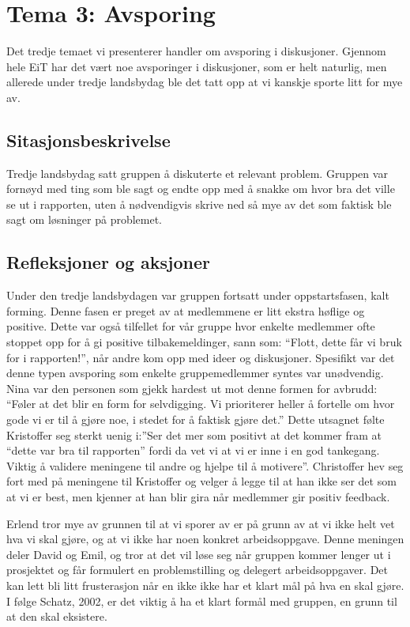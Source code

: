 \chapter{Tema 3: Avsporing}
Det tredje temaet vi presenterer handler om avsporing i diskusjoner. Gjennom hele EiT har det vært noe avsporinger i diskusjoner, som er helt naturlig, men allerede under tredje landsbydag ble det tatt opp at vi kanskje sporte litt for mye av.
\section{Sitasjonsbeskrivelse}
Tredje landsbydag satt gruppen å diskuterte et relevant problem. Gruppen var fornøyd med ting som ble sagt og endte opp med å snakke om hvor bra det ville se ut i rapporten, uten å nødvendigvis skrive ned så mye av det som faktisk ble sagt om løsninger på problemet.
\section{Refleksjoner og aksjoner}
Under den tredje landsbydagen var gruppen fortsatt under oppstartsfasen, kalt forming. Denne fasen er preget av at medlemmene er litt ekstra høflige og positive. Dette var også tilfellet for vår gruppe hvor enkelte medlemmer ofte stoppet opp for å gi positive tilbakemeldinger, sann som: “Flott, dette får vi bruk for i rapporten!”, når andre kom opp med ideer og diskusjoner. Spesifikt var det denne typen avsporing som enkelte gruppemedlemmer syntes var unødvendig. Nina var den personen som gjekk hardest ut mot denne formen for avbrudd: “Føler at det blir en form for selvdigging. Vi prioriterer heller å fortelle om hvor gode vi er til å gjøre noe, i stedet for å faktisk gjøre det.” Dette utsagnet følte Kristoffer seg sterkt uenig i:”Ser det mer som positivt at det kommer fram at “dette var bra til rapporten” fordi da vet vi at vi er inne i en god tankegang. Viktig å validere meningene til andre og hjelpe til å motivere”. Christoffer hev seg fort med på meningene til Kristoffer og velger å legge til at han ikke ser det som at vi er best, men kjenner at han blir gira når medlemmer gir positiv feedback. 

Erlend tror mye av grunnen til at vi sporer av er på grunn av at vi ikke helt vet hva vi skal gjøre, og at vi ikke har noen konkret arbeidsoppgave. Denne meningen deler David og Emil, og tror at det vil løse seg når gruppen kommer lenger ut i prosjektet og får formulert en problemstilling og delegert arbeidsoppgaver. Det kan lett bli litt frusterasjon når en ikke ikke har et klart mål på hva en skal gjøre. I følge Schatz, 2002, er det viktig å ha et klart formål med gruppen, en grunn til at den skal eksistere.

